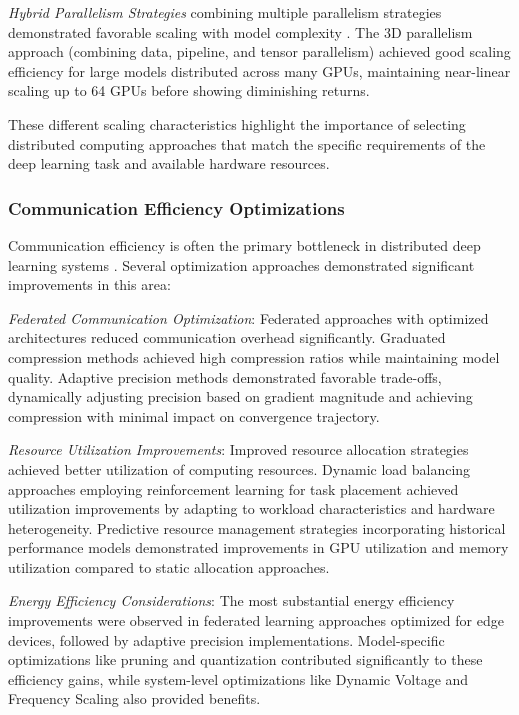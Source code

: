 \documentclass[acmsmall]{acmart}
\begin{document}
\textit{Hybrid Parallelism Strategies} combining multiple parallelism strategies demonstrated favorable scaling with model complexity \citep{Narayanan2021}. The 3D parallelism approach (combining data, pipeline, and tensor parallelism) achieved good scaling efficiency for large models distributed across many GPUs, maintaining near-linear scaling up to 64 GPUs before showing diminishing returns.

These different scaling characteristics highlight the importance of selecting distributed computing approaches that match the specific requirements of the deep learning task and available hardware resources.

\subsubsection{Communication Efficiency Optimizations}\label{subsubsec:scalability-characteristics-rq22:communication-efficiency-optimizations}
Communication efficiency is often the primary bottleneck in distributed deep learning systems \citep{Alistarh2017}. Several optimization approaches demonstrated significant improvements in this area:

\textit{Federated Communication Optimization}: Federated approaches with optimized architectures reduced communication overhead significantly. Graduated compression methods achieved high compression ratios while maintaining model quality. Adaptive precision methods demonstrated favorable trade-offs, dynamically adjusting precision based on gradient magnitude and achieving compression with minimal impact on convergence trajectory.

\textit{Resource Utilization Improvements}: Improved resource allocation strategies achieved better utilization of computing resources. Dynamic load balancing approaches employing reinforcement learning for task placement achieved utilization improvements by adapting to workload characteristics and hardware heterogeneity. Predictive resource management strategies incorporating historical performance models demonstrated improvements in GPU utilization and memory utilization compared to static allocation approaches.

\textit{Energy Efficiency Considerations}: The most substantial energy efficiency improvements were observed in federated learning approaches optimized for edge devices, followed by adaptive precision implementations. Model-specific optimizations like pruning and quantization contributed significantly to these efficiency gains, while system-level optimizations like Dynamic Voltage and Frequency Scaling also provided benefits.
\end{document}
